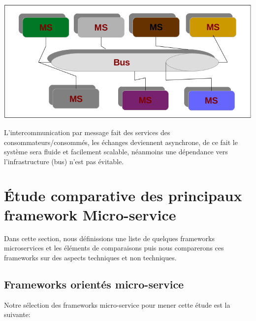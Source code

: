 \documentclass[12pt, a4paper, openany]{report}
\begin{document}
    \begin{center}
      \includegraphics[scale=0.3]{intercomm_msg_26.png}
      \label{fig26}
    \end{center} 
   
    L'intercommunication par message fait des services des consommateurs/consommés, les échanges deviennent asynchrone, de ce fait le système sera fluide et facilement scalable, néanmoins une dépendance vers l'infrastructure (bus) n'est pas évitable. 
   
     
\chapter{Étude comparative des principaux framework Micro-service}
 
  Dans cette section, nous définissions une liste de quelques frameworks microservices et les éléments de comparaisons puis nous comparerons ces frameworks sur des aspects techniques et non techniques.\\
  
 \section{Frameworks orientés micro-service}
 
  Notre sélection des frameworks micro-service pour mener cette étude est la suivante:
  
\end{document}
